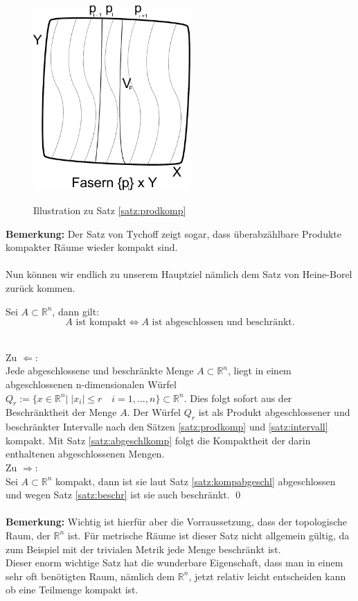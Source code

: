 \begin{figure}[ht]
	\centering
	\includegraphics[width=6cm]{produkt_kompakter_raueme.pdf}
	\label{fig:satzprodkomp}
	\caption{Illustration zu Satz \ref{satz:prodkomp}}
\end{figure}
%	
\textbf{Bemerkung:} Der Satz von Tychoff zeigt sogar, dass überabzählbare Produkte kompakter Räume wieder kompakt sind. \\
%
\\
Nun können wir endlich zu unserem Hauptziel nämlich dem Satz von Heine-Borel zurück kommen.
%	
\begin{Satz}
	Sei \( A \subset \mathbb{R}^n \), dann gilt:
	\[A \mbox{ ist kompakt} \Leftrightarrow A \mbox{ ist abgeschlossen und beschränkt.} \]
\end{Satz}
%
 \\
	Zu \(\Leftarrow \): \\
	Jede abgeschlossene und beschränkte Menge \(A \subset\mathbb{R}^n \), liegt in einem abgeschlossenen n-dimensionalen Würfel
	\( Q_r:= \{ x \in \mathbb{R}^n | \; |x_i| \leq r \quad i=1, \dots, n\} \subset \mathbb{R}^n \). 
	Dies folgt sofort aus der Beschränktheit der Menge \(A\). Der Würfel \(Q_r\) ist als Produkt abgeschlossener und beschränkter Intervalle nach den Sätzen \ref{satz:prodkomp} und
	\ref{satz:intervall} kompakt.
	Mit Satz \ref{satz:abgeschlkomp} folgt die Kompaktheit der darin enthaltenen abgeschlossenen Mengen.
	\\
	Zu \(\Rightarrow \): \\
	Sei \( A \subset \mathbb{R}^n \) kompakt, dann ist sie laut Satz \ref{satz:kompabgeschl} abgeschlossen und wegen Satz \ref{satz:beschr} ist sie auch beschränkt.
\qed \\
%
\\
\textbf{Bemerkung:} Wichtig ist hierfür aber die Vorraussetzung, dass der topologische Raum, der \(\mathbb{R}^n \) ist. Für metrische Räume ist dieser Satz nicht allgemein gültig, da zum Beispiel mit der trivialen Metrik jede Menge beschränkt ist.
\\
%
Dieser enorm wichtige Satz hat die wunderbare Eigenschaft, dass man in einem sehr oft benötigten Raum, nämlich dem \(\mathbb{R}^n \), 
jetzt relativ leicht entscheiden kann ob eine Teilmenge kompakt ist. 

